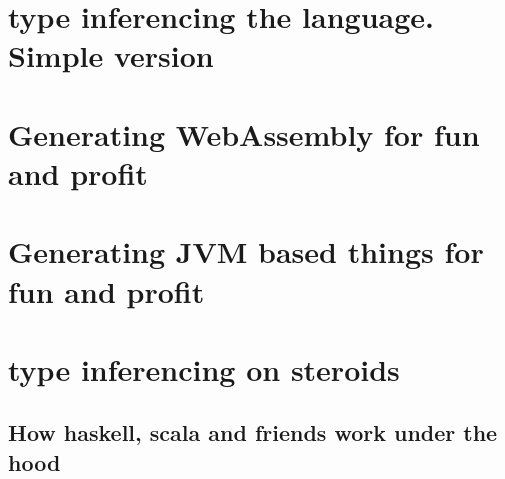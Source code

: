\documentclass[11pt]{article}
\begin{document}
\section{type inferencing  the language. Simple version}
\label{sec:orgda566bf}
\section{Generating WebAssembly for fun and profit}
\label{sec:org06ab16c}
\section{Generating JVM based things for fun and profit}
\label{sec:org1e47e89}
\section{type inferencing on steroids}
\label{sec:orgeb1422d}
\subsection{How haskell, scala and friends work under the hood}
\label{sec:org120beeb}
\end{document}
